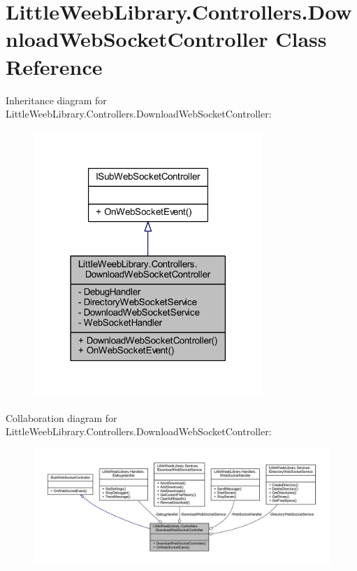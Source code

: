 \hypertarget{class_little_weeb_library_1_1_controllers_1_1_download_web_socket_controller}{}\section{Little\+Weeb\+Library.\+Controllers.\+Download\+Web\+Socket\+Controller Class Reference}
\label{class_little_weeb_library_1_1_controllers_1_1_download_web_socket_controller}


Inheritance diagram for Little\+Weeb\+Library.\+Controllers.\+Download\+Web\+Socket\+Controller\+:\nopagebreak
\begin{figure}[H]
\begin{center}
\leavevmode
\includegraphics[width=246pt]{class_little_weeb_library_1_1_controllers_1_1_download_web_socket_controller__inherit__graph}
\end{center}
\end{figure}


Collaboration diagram for Little\+Weeb\+Library.\+Controllers.\+Download\+Web\+Socket\+Controller\+:\nopagebreak
\begin{figure}[H]
\begin{center}
\leavevmode
\includegraphics[width=350pt]{class_little_weeb_library_1_1_controllers_1_1_download_web_socket_controller__coll__graph}
\end{center}
\end{figure}
